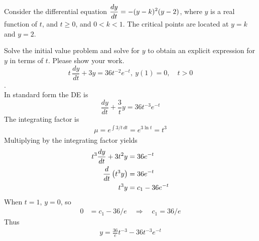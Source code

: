 \ifnum {}
\question[5] %
Consider the differential equation $\displaystyle {\frac{dy}{dt}} = -(y-k)^2(y-2)$, where $y$ is a real function of $t$, and $t \ge 0$, and $0<k<1$. The critical points are located at $y=k$ and $y=2$. 
\ifnum {} {\color{DarkBlue} 
} 
\else 
\fi
\fi


\ifnum {}
\ifnum {} \newpage \fi
\question[5] Solve the initial value problem and solve for $y$ to obtain an explicit expression for $y$ in terms of $t$. Please show your work.
$$\displaystyle t\,\frac{dy}{dt} + 3y =  36 t^{-2}e^{-t}, \ y(1) = 0, \quad t > 0$$.
\ifnum {} {\color{DarkBlue} \\[12pt] 
In standard form the DE is
$$\displaystyle \frac{dy}{dt} + \frac3t y =  36 t^{-3}e^{-t}$$
The integrating factor is
\begin{align}
    \mu = e^{\int 3/t \, dt} = e^{3 \ln t} = t^3
\end{align}
Multiplying by the integrating factor yields
\begin{align}
    t^3 {\frac{dy}{dt}} + 3t^2 y &= 36e^{-t} \\
    {\frac{d}{dt}} \left( t^3 y \right) &= 36e^{-t} \\
     t^3 y  &= c_1 - 36e^{-t} 
\end{align}
When $t=1$, $y=0$, so
\begin{align}
    0 &= c_1 - 36/e \quad \Rightarrow \quad c_1 = 36/e
\end{align}
Thus
\begin{align}
    y = \frac{36}{e}t^{-3} - 36 t^{-3}e^{-t}
\end{align}
} 
\else 
\vspace{3cm}
\fi
\fi   



